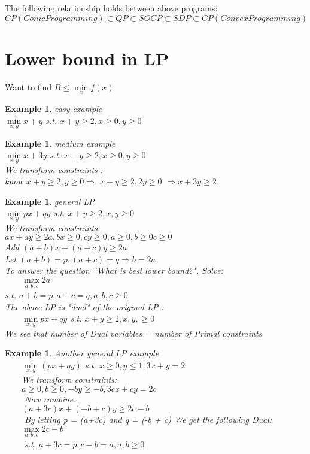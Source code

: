 \documentclass[10pt]{article}
\newtheorem{example}[ex]{Example}
\begin{document}
The following relationship holds between above programs: \\
$CP(Conic Programming) \subset QP \subset SOCP \subset SDP \subset CP(Convex Programming)$ 

\section{Lower bound in LP}
Want to find $B \le \min\limits_{x}f(x)$ 

\begin{example}
easy example \\
$\min\limits_{x,y} x+y $ s.t. $x+y \ge 2, x \ge 0, y \ge 0$
\end{example}


\begin{example}
medium example \\
$\min\limits_{x,y} x + 3y $ s.t. $x + y \ge 2, x \ge 0, y \ge 0$ \\
We transform constraints : \\
know $x + y \ge 2, y \ge 0 \Rightarrow$ $ x + y \ge 2, 2y \ge 0$ $\Rightarrow x + 3y \ge 2$
\end{example}

\begin{example} general LP \\
$\min\limits_{x,y} px + qy$ s.t. $ x + y \ge 2, x ,y \ge 0 $ \\
We transform constraints: \\
$ax + ay \ge 2a, bx \ge 0, cy \ge 0, a \ge 0, b \ge 0  c \ge 0$ \\
Add $(a+b)x + (a +c) y \ge 2a $ \\ 
Let $(a+b) = p, (a+c) =q \Rightarrow b = 2a$ \\
To answer the question ``What is best lower bound?", Solve: \\
$\qquad \max\limits_{a,b,c} 2a $\\ s.t. $ a + b = p, a + c =q , a, b, c \ge 0$ \\
The above LP is "dual" of the original LP : \\
$\qquad \min\limits_{x,y} px + qy$ s.t. $ x+y \ge 2, x, y, \ge 0$ \\
We see that number of Dual variables = number of Primal constraints 
\end{example}

\begin{example} Another general LP example \\
$\qquad \min\limits_{x,y}(px + qy) $ 	s.t. $x \ge 0, y \le 1, 3x + y = 2$ \\
$\qquad$We transform constraints: \\
$\qquad a \ge 0, b \ge 0, -by \ge -b, 3cx + cy = 2c$ \\
$\qquad$ Now combine: \\
$\qquad (a + 3c)x + (-b +c )y \ge 2c - b$ \\ 
$\qquad$ By letting p = (a+3c) and q = (-b + c) We get the following Dual: \\
$\qquad \max\limits_{a,b,c} 2c - b$ \\
$\qquad$ s.t. $ a +3c = p, c- b =a , a, b \ge 0$
\end{example}
\end{document}
